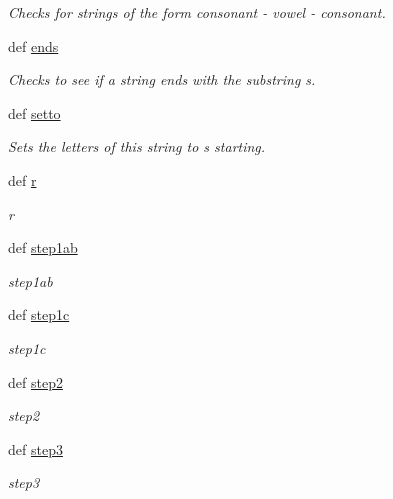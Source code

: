 \begin{DoxyCompactItemize}
\begin{DoxyCompactList}\small\item\em Checks for strings of the form consonant -\/ vowel -\/ consonant. \end{DoxyCompactList}\item 
def \hyperlink{classgographer_1_1utils_1_1_porter_stemmer_a903c2244c66cb662105b0772d977c420}{ends}
\begin{DoxyCompactList}\small\item\em Checks to see if a string ends with the substring s. \end{DoxyCompactList}\item 
def \hyperlink{classgographer_1_1utils_1_1_porter_stemmer_a1d7543ea5196fc78e857bd91d998aedc}{setto}
\begin{DoxyCompactList}\small\item\em Sets the letters of this string to s starting. \end{DoxyCompactList}\item 
def \hyperlink{classgographer_1_1utils_1_1_porter_stemmer_a40bac9d33429742a4422159125ab63ed}{r}
\begin{DoxyCompactList}\small\item\em r \end{DoxyCompactList}\item 
def \hyperlink{classgographer_1_1utils_1_1_porter_stemmer_a601c29a1c66aed4dd0b9f263dc418c86}{step1ab}
\begin{DoxyCompactList}\small\item\em step1ab \end{DoxyCompactList}\item 
def \hyperlink{classgographer_1_1utils_1_1_porter_stemmer_a7c014f2f1973d1d0093ee57de30f5450}{step1c}
\begin{DoxyCompactList}\small\item\em step1c \end{DoxyCompactList}\item 
def \hyperlink{classgographer_1_1utils_1_1_porter_stemmer_a9da62dbc4b330e0a0679f7d6e59310e5}{step2}
\begin{DoxyCompactList}\small\item\em step2 \end{DoxyCompactList}\item 
def \hyperlink{classgographer_1_1utils_1_1_porter_stemmer_ab0e455f72fcc79390844164a07c9e7d6}{step3}
\begin{DoxyCompactList}\small\item\em step3 \end{DoxyCompactList}\item 

\end{DoxyCompactItemize}
